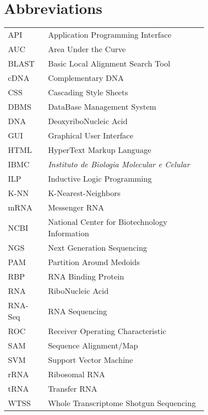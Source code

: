 \chapter*{Abbreviations}

\begin{flushleft}
\begin{tabular}{l p{0.8\linewidth}}
API       & Application Programming Interface\\
AUC       & Area Under the Curve\\
BLAST     & Basic Local Alignment Search Tool\\
cDNA      & Complementary DNA\\
CSS       & Cascading Style Sheets\\
DBMS      & DataBase Management System\\
DNA       & DeoxyriboNucleic Acid\\
GUI       & Graphical User Interface\\
HTML      & HyperText Markup Language\\
IBMC      & \textit{Instituto de Biologia Molecular e Celular}\\
ILP       & Inductive Logic Programming\\
K-NN      & K-Nearest-Neighbors\\
mRNA      & Messenger RNA\\
NCBI      & National Center for Biotechnology Information\\
NGS       & Next Generation Sequencing\\
PAM       & Partition Around Medoids\\
RBP       & RNA Binding Protein\\
RNA       & RiboNucleic Acid\\
RNA-Seq   & RNA Sequencing\\
ROC       & Receiver Operating Characteristic\\
SAM       & Sequence Alignment/Map\\
SVM       & Support Vector Machine\\
rRNA      & Ribosomal RNA\\
tRNA      & Transfer RNA\\
WTSS      & Whole Transcriptome Shotgun Sequencing\\
\end{tabular}
\end{flushleft}

